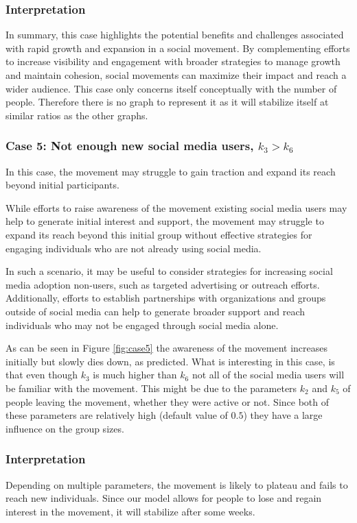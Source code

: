 \documentclass{article}
\begin{document}
    \subsubsection*{Interpretation} In summary,  this case highlights the potential benefits and challenges associated with rapid growth and expansion in a social movement. By complementing efforts to increase visibility and engagement with broader strategies to manage growth and maintain cohesion, social movements can maximize their impact and reach a wider audience.
    This case only concerns itself conceptually with the number of people. Therefore there is no graph to represent it as it will stabilize itself at similar ratios as the other graphs.

    \subsubsection*{Case 5: Not enough new social media users, $k_3 > k_6$}
    In this case, the movement may struggle to gain traction and expand its reach beyond initial participants.
    
    While efforts to raise awareness of the movement  existing social media users may help to generate initial interest and support, the movement may struggle to expand its reach beyond this initial group without effective strategies for engaging individuals who are not already using social media.
    
    In such a scenario, it may be useful to consider strategies for increasing social media adoption  non-users, such as targeted advertising or outreach efforts. Additionally, efforts to establish partnerships with organizations and groups outside of social media can help to generate broader support and reach individuals who may not be engaged through social media alone.

    As can be seen in Figure \ref{fig:case5} the awareness of the movement increases initially but slowly dies down, as predicted. What is interesting in this case, is that even though $k_3$ is much higher than $k_6$ not all of the social media users will be familiar with the movement. This might be due to the parameters $k_2$ and $k_5$ of people leaving the movement, whether they were active or not. Since both of these parameters are relatively high (default value of $0.5$) they have a large influence on the group sizes. 
    
    \subsubsection*{Interpretation}
    Depending on multiple parameters, the movement is likely to plateau and fails to reach new individuals. Since our model allows for people to lose and regain interest in the movement, it will stabilize after some weeks. 
    
\end{document}
